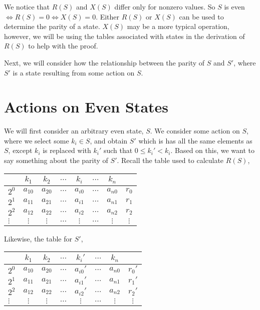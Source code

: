 \documentclass[12pt]{article}
\begin{document}
We notice that $R(S)$ and $X(S)$ differ only for nonzero values. So $S$ is even $\iff R(S)=0 \iff X(S)=0$. Either $R(S)$ or $X(S)$ can be used to determine the parity of a state. $X(S)$ may be a more typical operation, however, we will be using the tables associated with states in the derivation of $R(S)$ to help with the proof.

Next, we will consider how the relationship between the parity of $S$ and $S'$, where $S'$ is a state resulting from some action on $S$.

\section{Actions on Even States}
We will first consider an arbitrary even state, $S$. We consider some action on $S$, where we select some $k_i\in S$, and obtain $S'$ which is has all the same elements as $S$, except $k_i$ is replaced with $k_i'$ such that $0\leq k_i' < k_i$. Based on this, we want to say something about the parity of $S'$. Recall the table used to calculate $R(S)$,
\begin{center}
    \begin{tabular}{l|cccccc|c}
         & $k_1$ & $k_2$ & $\dots$  & $k_i$ & $\dots$& $k_n$ & \\
         \hline
        \cellcolor{white} $2^0$ & $a_{10}$ & $a_{20}$ & $\dots$ & $a_{i0}$ & $\dots$ & $a_{n0}$ & $r_0$ \\
        \cellcolor{white} $2^1$ & $a_{11}$ & $a_{21}$ & $\dots$ & $a_{i1}$ & $\dots$ & $a_{n1}$ & $r_1$ \\
        \cellcolor{white} $2^2$ & $a_{12}$ & $a_{22}$ & $\dots$ & $a_{i2}$ & $\dots$ & $a_{n2}$ & $r_2$ \\
        $\vdots$ & $\vdots$ & $\vdots$ & $\dots$ & $\vdots$ & $\dots$ & $\vdots$ & $\vdots$
    \end{tabular}
\end{center}

Likewise, the table for $S'$,
\begin{center}
    \begin{tabular}{l|cccccc|c}
         & $k_1$ & $k_2$ & $\dots$  & $k_i'$ & $\dots$& $k_n$ & \\
         \hline
        \cellcolor{white} $2^0$ & $a_{10}$ & $a_{20}$ & $\dots$ & $a_{i0}'$ & $\dots$ & $a_{n0}$ & $r_0'$ \\
        \cellcolor{white} $2^1$ & $a_{11}$ & $a_{21}$ & $\dots$ & $a_{i1}'$ & $\dots$ & $a_{n1}$ & $r_1'$ \\
        \cellcolor{white} $2^2$ & $a_{12}$ & $a_{22}$ & $\dots$ & $a_{i2}'$ & $\dots$ & $a_{n2}$ & $r_2'$ \\
        $\vdots$ & $\vdots$ & $\vdots$ & $\dots$ & $\vdots$ & $\dots$ & $\vdots$ & $\vdots$
    \end{tabular}
\end{center}
\end{document}
